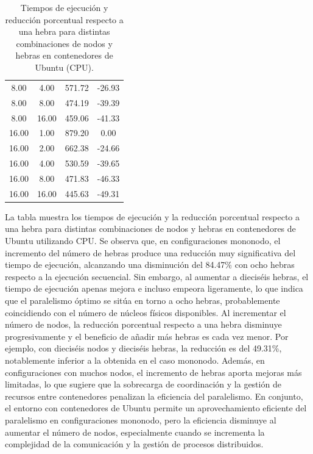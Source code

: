 \begin{table}[ht]
\begin{tabular}{|c|c|c|c|}
        8.00           & 4.00            & 571.72              & -26.93                         \\
        8.00           & 8.00            & 474.19              & -39.39                         \\
        8.00           & 16.00           & 459.06              & -41.33                         \\
        16.00          & 1.00            & 879.20              & 0.00                           \\
        16.00          & 2.00            & 662.38              & -24.66                         \\
        16.00          & 4.00            & 530.59              & -39.65                         \\
        16.00          & 8.00            & 471.83              & -46.33                         \\
        16.00          & 16.00           & 445.63              & -49.31                         \\
        \hline
    \end{tabular}
    \caption{Tiempos de ejecución y reducción porcentual respecto a una hebra para distintas combinaciones de nodos y hebras en contenedores de Ubuntu (CPU).}
    \label{tab:thread_sweep_ubuntu_\textit{Docker}_time}
\end{table}

La tabla muestra los tiempos de ejecución y la reducción porcentual respecto a una hebra para distintas combinaciones de nodos y hebras en contenedores de Ubuntu utilizando CPU. Se observa que, en configuraciones mononodo, el incremento del número de hebras produce una reducción muy significativa del tiempo de ejecución, alcanzando una disminución del 84.47\% con ocho hebras respecto a la ejecución secuencial. Sin embargo, al aumentar a dieciséis hebras, el tiempo de ejecución apenas mejora e incluso empeora ligeramente, lo que indica que el paralelismo óptimo se sitúa en torno a ocho hebras, probablemente coincidiendo con el número de núcleos físicos disponibles. Al incrementar el número de nodos, la reducción porcentual respecto a una hebra disminuye progresivamente y el beneficio de añadir más hebras es cada vez menor. Por ejemplo, con dieciséis nodos y dieciséis hebras, la reducción es del 49.31\%, notablemente inferior a la obtenida en el caso mononodo. Además, en configuraciones con muchos nodos, el incremento de hebras aporta mejoras más limitadas, lo que sugiere que la sobrecarga de coordinación y la gestión de recursos entre contenedores penalizan la eficiencia del paralelismo. En conjunto, el entorno con contenedores de Ubuntu permite un aprovechamiento eficiente del paralelismo en configuraciones mononodo, pero la eficiencia disminuye al aumentar el número de nodos, especialmente cuando se incrementa la complejidad de la comunicación y la gestión de procesos distribuidos.

